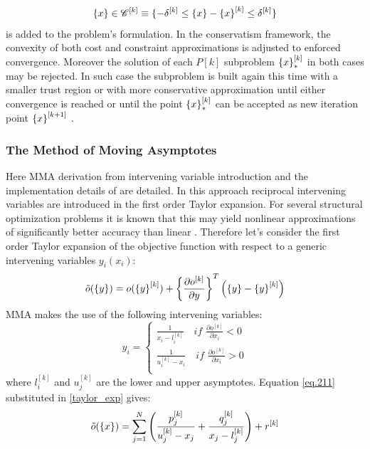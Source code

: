 \begin{equation}
\left\lbrace{x}\right \rbrace\in \mathscr{C}^{[k]}\equiv \lbrace -\delta^{[k]} \leq \left\lbrace{x}\right \rbrace-\left\lbrace{x}\right \rbrace^{[k]}\leq \delta^{[k]} \rbrace
\end{equation}
is added to the problem's formulation.
In the conservatism framework, the convexity of both cost and constraint approximations is adjusted to enforced convergence. Moreover the solution of each $P[k]$ subproblem $\left\lbrace{x}\right \rbrace^{[k]}_*$ in both cases may be rejected. In such case the subproblem is built again this time with a smaller trust region or with more conservative approximation until either convergence is reached or until the point  $\left\lbrace{x}\right \rbrace^{[k]}_*$ can be accepted as new iteration point $\left\lbrace{x}\right \rbrace^{[k+1]}$ \cite{svanberg2002class}.
 \subsubsection{The Method of Moving Asymptotes}
 Here MMA derivation from intervening variable introduction and the implementation details of \cite{svanberg2007mma} are detailed.
 In this approach reciprocal intervening variables are introduced in the first order Taylor expansion. For several structural optimization problems it is known that this may yield nonlinear approximations of significantly better accuracy than linear \cite{etman2012first}. Therefore let’s consider the first order Taylor expansion of the objective function with respect to a generic intervening variables $y_i(x_i)$:
 \begin{equation}
 \label{taylor_exp}
\tilde{o}(\left\lbrace{y}\right \rbrace)=o(\left\lbrace{y}\right \rbrace^{[k]})+\left\lbrace{\frac{\partial o^{[k]}}{\partial y}}\right \rbrace^T\left(\left\lbrace{y}\right \rbrace-\left\lbrace{y}\right \rbrace^{[k]}\right)
 \end{equation}
MMA makes the use of the following intervening variables:
\begin{equation}
\label{eq.211}
y_i=
\begin{cases}
\frac{1}{x_i-l_i^{[k]}} \quad \textit{if } \frac{\partial o^{[k]}}{\partial x_i}<0\\
\frac{1}{u_i^{[k]}-x_i} \quad \textit{if } \frac{\partial o^{[k]}}{\partial x_i}>0\\
\end{cases}
\end{equation}
where $l_i^{[k]}$ and $u_j^{[k]}$ are the lower and upper asymptotes. 
Equation \eqref{eq.211} substituted in \eqref{taylor_exp} gives:
\begin{equation}
\tilde{o}(\left\lbrace{x}\right \rbrace)=\sum_{j=1}^N\left(\frac{p_j^{[k]}}{u_j^{[k]}-x_j}+\frac{q_j^{[k]}}{x_j-l_j^{[k]}}\right)+r^{[k]}
\end{equation}

